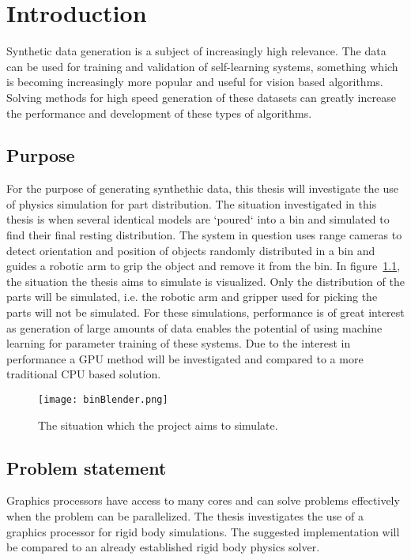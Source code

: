 \chapter{Introduction}\label{cha:intro}

Synthetic data generation is a subject of increasingly high relevance.
The data can be used for training and validation of self-learning systems,
something which is becoming increasingly more popular and useful for vision based
algorithms. Solving methods for high speed generation of these datasets
can greatly increase the performance and development of these
types of algorithms.

\section{Purpose}
For the purpose of generating synthethic data, this thesis will investigate the use of physics
simulation for part distribution. The situation investigated in this thesis
is when several identical models are `poured` into a bin and simulated to find their
final resting distribution. The system in question uses range cameras to detect
orientation and position of objects randomly distributed in a bin and guides
a robotic arm to grip the object and remove it from the bin.
In figure~\ref{fig:plb}, the situation
the thesis aims to simulate is visualized. Only the distribution of the parts
will be simulated, i.e. the robotic arm and gripper used for picking the parts will not be simulated.
 For these simulations,
performance is of great interest as generation of large amounts of data enables the potential of using machine learning
for parameter training of these systems. Due to the interest in performance a GPU method will
be investigated and compared to a more traditional CPU based solution.

\begin{figure}[ht]
  \centering
  \texttt{[image: binBlender.png]}
  \caption{The situation which the project aims to simulate.}
  \label{fig:plb}
\end{figure}

\section{Problem statement}
Graphics processors have access to many cores and can solve problems effectively when
the problem can be parallelized. The thesis investigates the use of a graphics processor
for rigid body simulations. The suggested implementation will be compared to an
already established rigid body physics solver.

